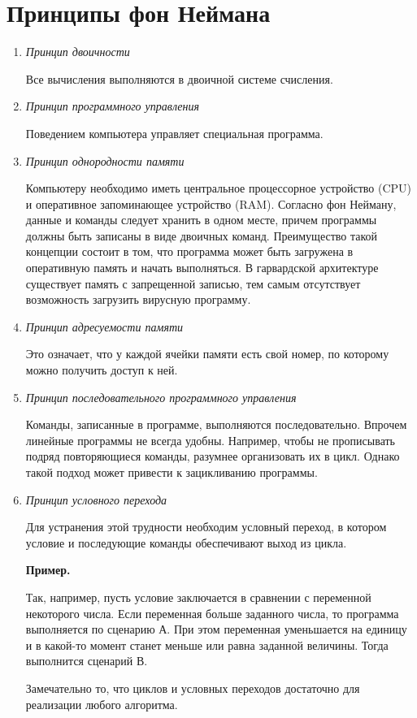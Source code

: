 \documentclass[a4paper, fleqn]{article}
\newenvironment{example}[1][]{\medskip \noindent \textbf{Пример. #1}\par \nopagebreak}{\medskip \par} %
\begin{document}
	\section*{Принципы фон Неймана}
		\begin {enumerate}
			\item \emph{Принцип двоичности}
			
			Все вычисления выполняются в двоичной системе счисления.
			
			\item \emph{Принцип программного управления}
			
			Поведением компьютера управляет специальная программа.
						
			\item \emph{Принцип однородности памяти}
			
			Компьютеру необходимо иметь центральное процессорное устройство (CPU) и оперативное запоминающее устройство (RAM). Согласно фон Нейману, данные и команды следует хранить в одном месте, причем программы должны быть записаны  в виде двоичных команд. Преимущество такой концепции состоит в том, что программа может быть загружена в оперативную память и начать выполняться.
			В гарвардской архитектуре существует память с запрещенной записью, тем самым отсутствует возможность загрузить вирусную программу.
			
			\item \emph{Принцип адресуемости памяти}
			
			Это означает, что у каждой ячейки памяти есть свой номер, по которому можно получить доступ к ней.
			
			\item \emph{Принцип последовательного программного управления} 
			
			Команды, записанные в программе, выполняются последовательно. 
			Впрочем линейные программы не всегда удобны. Например, чтобы не прописывать подряд повторяющиеся команды, разумнее организовать их в цикл.  Однако такой подход может привести к зацикливанию программы.
			
			\item \emph{Принцип условного перехода}
			
			Для устранения этой трудности необходим условный переход, в котором условие и последующие команды обеспечивают выход из цикла.
			
			\begin{example}
				Так, например, пусть условие заключается в сравнении с переменной  некоторого числа.  Если переменная больше заданного числа,  то программа выполняется по сценарию А. При этом переменная уменьшается на единицу и в какой-то момент станет меньше или равна заданной величины. Тогда выполнится сценарий В.
			\end{example}
			
			Замечательно то, что циклов и условных переходов достаточно для  реализации любого алгоритма. 
			
		\end {enumerate}
		
\end{document}
